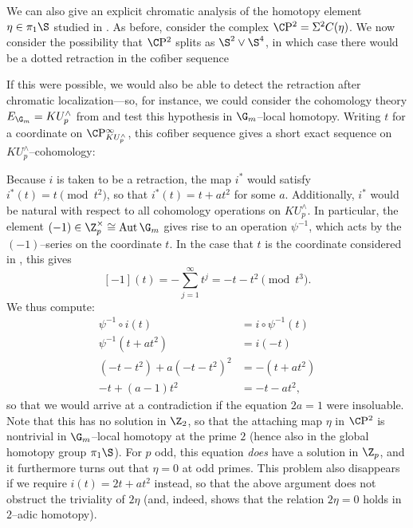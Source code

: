 \begin{example}
We can also give an explicit chromatic analysis of the homotopy element \(\eta \in \pi_1 \S\) studied in .  As before, consider the complex \(\CP^2 = \Susp^2 C(\eta)\).  We now consider the possibility that \(\CP^2\) splits as \(\S^2 \vee \S^4\), in which case there would be a dotted retraction in the cofiber sequence
\begin{center}
\end{center}
If this were possible, we would also be able to detect the retraction after chromatic localization---so, for instance, we could consider the cohomology theory \(E_{\G_m} = KU^\wedge_p\) from  and test this hypothesis in \(\G_m\)--local homotopy.  Writing \(t\) for a coordinate on \(\CP^\infty_{KU^\wedge_p}\), this cofiber sequence gives a short exact sequence on \(KU^\wedge_p\)--cohomology:
\begin{center}
\end{center}
Because \(i\) is taken to be a retraction, the map \(i^*\) would satisfy \(i^*(t) = t \pmod{t^2}\), so that \(i^*(t) = t + at^2\) for some \(a\).  Additionally, \(i^*\) would be natural with respect to all cohomology operations on \(KU^\wedge_p\).  In particular, the element \((-1) \in \Z_p^\times \cong \Aut \G_m\) gives rise to an operation \(\psi^{-1}\), which acts by the \((-1)\)--series on the coordinate \(t\).  In the case that \(t\) is the coordinate considered in , this gives \[[-1](t) = -\sum_{j=1}^\infty t^j = -t - t^2 \pmod{t^3}.\]  We thus compute:
\begin{align*}
\psi^{-1} \circ i(t) & = i \circ \psi^{-1}(t) \\
\psi^{-1}(t + at^2) & = i(-t) \\
(-t - t^2) + a(-t - t^2)^2 & = -(t + at^2) \\
-t + (a - 1) t^2 & = -t - at^2,
\end{align*}
so that we would arrive at a contradiction if the equation \(2a = 1\) were insoluable.  Note that this has no solution in \(\Z_2\), so that the attaching map \(\eta\) in \(\CP^2\) is nontrivial in \(\G_m\)--local homotopy at the prime \(2\) (hence also in the global homotopy group \(\pi_1 \S\)).  For \(p\) odd, this equation \emph{does} have a solution in \(\Z_p\), and it furthermore turns out that \(\eta = 0\) at odd primes.  This problem also disappears if we require \(i(t) = 2t + at^2\) instead, so that the above argument does not obstruct the triviality of \(2 \eta\) (and, indeed,  shows that the relation \(2 \eta = 0\) holds in \(2\)--adic homotopy).
\end{example}

